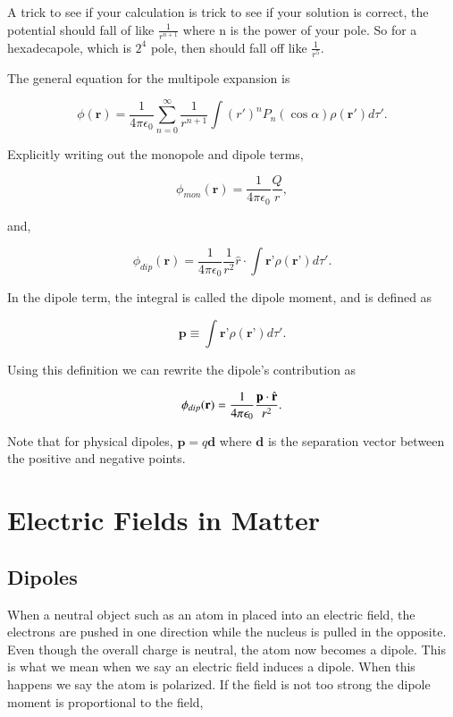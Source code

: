 \documentclass[preprint, review,12pt]{elsarticle}
\def\k{\frac{1}{4 \pi \epsilon_0}}
\def\.{\cdot}
\def\b{\textbf}
\begin{document}
A trick to see if your calculation is trick to see if your solution is correct, the potential should fall of like $\frac{1}{r^{n+1}}$ where n is the power of your pole. So for a hexadecapole, which is $2^4$ pole, then should fall off like $\frac{1}{r^5}$.

The general equation for the multipole expansion is

\begin{equation}
    \phi(\b{r}) = \frac{1}{4\pi \epsilon_0} \sum_{n=0}^\infty \frac{1}{r^{n+1}} \int (r')^n P_n(\cos \alpha ) \rho(\b{r}')d\tau'.
\end{equation}


Explicitly writing out the monopole and dipole terms,

\begin{equation}
    \phi_{mon}(\b{r}) = \k \frac{Q}{r},
\end{equation}

and,

\begin{equation}
    \phi_{dip}(\b{r}) = \frac{1}{4 \pi \epsilon_0}\frac{1}{r^2}\hat{r}\. \int \b{r'}\rho(\b{r'})d\tau'.
\end{equation}

In the dipole term, the integral is called the dipole moment, and is defined as

\begin{equation}
    \b{p} \equiv \int\b{r'} \rho(\b{r'})d\tau'.
\end{equation}

Using this definition we can rewrite the dipole's contribution as

\begin{equation}
    \phi_{dip}(\b{r}) = \k\frac{\b{p}\. \hat{\b r}}{r^2}.
\end{equation}

Note that for physical dipoles, $\b{p} = q\b{d}$ where $\b{d}$ is the separation vector between the positive and negative points.

\section{Electric Fields in Matter}

\subsection{Dipoles}

When a neutral object such as an atom in placed into an electric field, the electrons are pushed in one direction while the nucleus is pulled in the opposite. Even though the overall charge is neutral, the atom now becomes a dipole. This is what we mean when we say an electric field induces a dipole. When this happens we say the atom is polarized. If the field is not too strong the dipole moment is proportional to the field,
\end{document}
